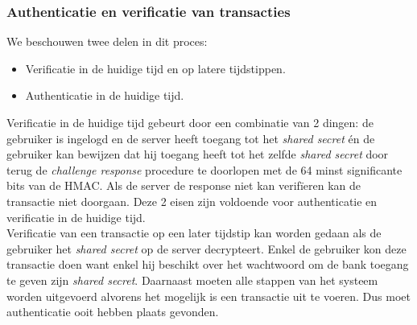 \documentclass[11pt]{article}
\begin{document}
\subsubsection{Authenticatie en verificatie van transacties}
We beschouwen twee delen in dit proces:
\begin{itemize}
\item Verificatie in de huidige tijd en op latere tijdstippen.
\item Authenticatie in de huidige tijd.
\end{itemize}
Verificatie in de huidige tijd gebeurt door een combinatie van 2 dingen: de gebruiker is ingelogd en de server heeft toegang tot het \emph{shared secret} \'en de gebruiker kan bewijzen dat hij toegang heeft tot het zelfde \emph{shared secret} door terug de \emph{challenge response} procedure te doorlopen met de 64 minst significante bits van de HMAC. Als de server de response niet kan verif\"ieren kan de transactie niet doorgaan. Deze 2 eisen zijn voldoende voor authenticatie en verificatie in de huidige tijd. \\

Verificatie van een transactie op een later tijdstip kan worden gedaan als de gebruiker het \emph{shared secret} op de server decrypteert. Enkel de gebruiker kon deze transactie doen want enkel hij beschikt over het wachtwoord om de bank toegang te geven zijn \emph{shared secret}. Daarnaast moeten alle stappen van het systeem worden uitgevoerd alvorens het mogelijk is een transactie uit te voeren. Dus moet authenticatie ooit hebben plaats gevonden.
\end{document}
